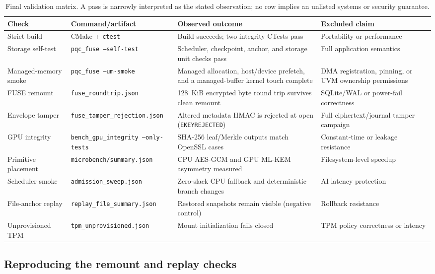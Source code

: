 \begin{table}[t]
\centering
\caption{Final validation matrix. A pass is narrowly interpreted as the stated observation; no row implies an unlisted systems or security guarantee.}
\small
\setlength{\tabcolsep}{3pt}
\begin{tabularx}{\textwidth}{P{0.20\textwidth}|P{0.22\textwidth}|Y|P{0.18\textwidth}}
\toprule
\textbf{Check} & \textbf{Command/artifact} & \textbf{Observed outcome} & \textbf{Excluded claim}\\
\midrule
Strict build & CMake + \texttt{ctest} & Build succeeds; two integrity CTests pass & Portability or performance\\
Storage self-test & \texttt{pqc\_fuse --self-test} & Scheduler, checkpoint, anchor, and storage unit checks pass & Full application semantics\\
Managed-memory smoke & \texttt{pqc\_fuse --um-smoke} & Managed allocation, host/device prefetch, and a managed-buffer kernel touch complete & DMA registration, pinning, or UVM ownership permissions\\
FUSE remount & \texttt{fuse\_roundtrip.json} & 128~KiB encrypted byte round trip survives clean remount & SQLite/WAL or power-fail correctness\\
Envelope tamper & \nolinkurl{fuse_tamper_rejection.json} & Altered metadata HMAC is rejected at open (\texttt{EKEYREJECTED}) & Full ciphertext/journal tamper campaign\\
GPU integrity & \texttt{bench\_gpu\_integrity --only-tests} & SHA-256 leaf/Merkle outputs match OpenSSL cases & Constant-time or leakage resistance\\
Primitive placement & \texttt{microbench/summary.json} & CPU AES-GCM and GPU ML-KEM asymmetry measured & Filesystem-level speedup\\
Scheduler smoke & \texttt{admission\_sweep.json} & Zero-slack CPU fallback and deterministic branch changes & AI latency protection\\
File-anchor replay & \texttt{replay\_file\_summary.json} & Restored snapshots remain visible (negative control) & Rollback resistance\\
Unprovisioned TPM & \texttt{tpm\_unprovisioned.json} & Mount initialization fails closed & TPM policy correctness or latency\\
\bottomrule
\end{tabularx}
\label{tab:workload_behavior}
\end{table}

\subsection{Reproducing the remount and replay checks}

